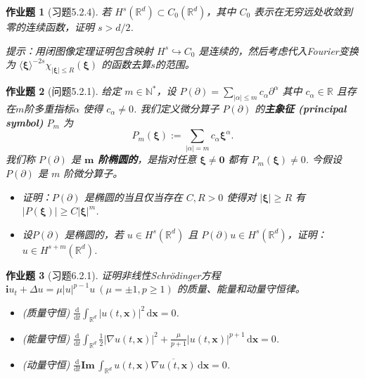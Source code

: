 \documentclass[UTF8,fontset=windows,12pt]{ctexart}
\theoremstyle{kaiti-theorem}
\newtheorem{problem}{作业题}
\numberwithin{equation}{section}
\renewcommand{\Im}{\textbf{Im}\,}
\newcommand{\R}{\mathbb{R}}
\newcommand{\N}{\mathbb{N}}
\newcommand{\bd}[1]{\mathbf{#1}}  %
\newcommand{\bds}[1]{\boldsymbol{#1}}  %
\newcommand{\p}{\partial}
\newcommand{\lap}{\Delta}
\newcommand{\nab}{\nabla}
\newcommand{\dxx}{\,\mathrm{d}\bds{x}}
\newcommand{\xxi}{\boldsymbol{\xi}}
\newcommand{\lee}{\langle}
\newcommand{\ree}{\rangle}
\newcommand{\ird}{\int_{\R^d}}
\newcommand{\ddt}{\frac{\mathrm{d}}{\mathrm{d}t}}
\providecommand{\len}[1]{\lee #1 \ree }
\newcommand{\xx}{{\bds{x}}}
\begin{document}
\begin{problem}[习题5.2.4]
若 $H^s(\R^d)\subset C_0(\R^d)$，其中 $C_0$ 表示在无穷远处收敛到零的连续函数，证明 $s>d/2$.

提示：用闭图像定理证明包含映射 $H^s\hookrightarrow C_0$ 是连续的，然后考虑代入Fourier变换为 $\len{\xxi}^{-2s}\chi_{|\xxi|\leqslant R}(\xxi)$ 的函数去算$s$的范围。
\end{problem}

\begin{problem}[问题5.2.1]
给定 $m\in\N^*$，设 $P(\p)=\sum\limits_{|\alpha|\leqslant m} c_\alpha\p^\alpha$ 其中 $c_\alpha\in\R$ 且存在$m$阶多重指标$\alpha$ 使得 $c_\alpha\neq 0$. 我们定义微分算子 $P(\p)$ 的\textbf{主象征 (principal symbol)} $P_m$ 为 $$P_m(\xxi):=\sum_{|\alpha|=m}c_\alpha\xxi^\alpha.$$ 我们称 $P(\p)$ 是 \textbf{$\mathbf{m}$ 阶椭圆的}，是指对任意 $\xxi\neq \bd{0}$ 都有 $P_m(\xxi)\neq 0$. 今假设 $P(\p)$ 是 $m$ 阶微分算子。
\begin{itemize}
\item [(1)] 证明：$P(\p)$ 是椭圆的当且仅当存在 $C,R>0$ 使得对 $|\xxi|\geqslant R$ 有 $|P(\xxi)|\geqslant C|\xxi|^m$.
\item [(2)] 设$P(\p)$ 是椭圆的，若 $u\in H^s(\R^d)$ 且 $P(\p) u\in H^s(\R^d)$，证明：$u\in H^{s+m}(\R^d)$.
\end{itemize}
\end{problem}

\begin{problem}[习题6.2.1]
证明非线性Schr\"odinger方程 $\bd{i}u_t+\lap u=\mu|u|^{p-1}u~(\mu=\pm 1, p\geqslant 1)$ 的质量、能量和动量守恒律。
\begin{itemize}
\item (质量守恒) $\ddt\ird |u(t,\xx)|^2\dxx=0$.
\item (能量守恒) $\ddt\ird \frac12|\nab u(t,\xx)|^2+\frac{\mu}{p+1}|u
(t,\xx)|^{p+1}\dxx=0$.
\item (动量守恒) $\ddt\Im\ird u(t,\xx)\overline{\nab u(t,\xx)}\dxx=0$.
\end{itemize}
\end{problem}
\end{document}
